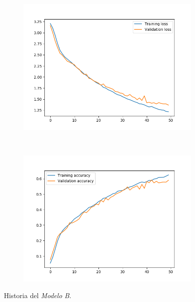 \documentclass[11pt,a4paper]{article}
\begin{document}
\begin{figure}[H]
  \centering
  \begin{subfigure}{.5\textwidth}
    \includegraphics[scale=0.4]{img/deep2-aug-loss.png}
    \label{fig:deep2-aug-loss}
  \end{subfigure}%
  ~ \quad
  \begin{subfigure}{.5\textwidth}
    \includegraphics[scale=0.4]{img/deep2-aug-acc.png}
    \label{fig:deep2-aug-acc}
  \end{subfigure}
  \caption{Historia del \textit{Modelo B}.}
  \label{fig:deep2-aug}
\end{figure}
\end{document}
